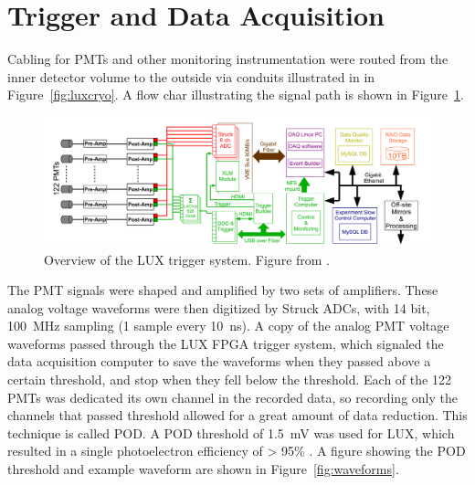 \section{Trigger and Data Acquisition}
Cabling for PMTs and other monitoring instrumentation were routed from the inner detector volume to the outside via conduits illustrated in in Figure~\ref{fig:luxcryo}. A flow char illustrating the signal path is shown in Figure~\ref{fig:luxdaq}. 

\begin{figure}[htbp]
\begin{center}
\includegraphics[width=\textwidth]{figures/lux/lux_daq.png}
\caption{Overview of the LUX trigger system. Figure from \cite{LUXTrigger}. }
\label{fig:luxdaq}
\end{center}
\end{figure}


The \ac{PMT} signals were shaped and amplified by two sets of amplifiers. These analog voltage waveforms were then digitized by Struck \ac{ADC}s, with 14 bit, 100~MHz sampling (1 sample every 10~ns). A copy of the analog \ac{PMT} voltage waveforms passed through the \ac{LUX} \ac{FPGA} trigger system, which signaled the data acquisition computer to save the waveforms when they passed above a certain threshold, and stop when they fell below the threshold. Each of the 122 \ac{PMT}s was dedicated its own channel in the recorded data, so recording only the channels that passed threshold allowed for a great amount of data reduction. This technique is called \ac{POD}. A \ac{POD} threshold of 1.5~mV was used for \ac{LUX}, which resulted in a single photoelectron efficiency of > 95\% \cite{LUX:Run03Comprehensive}. A figure showing the \ac{POD} threshold and example waveform are shown in Figure~\ref{fig:waveforms}. 


